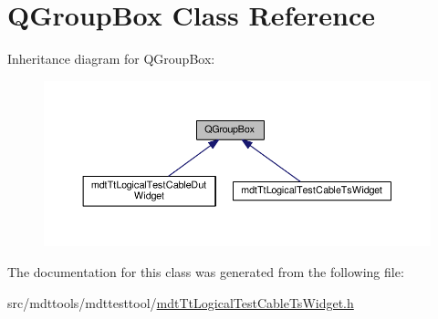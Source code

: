 \hypertarget{class_q_group_box}{\section{Q\-Group\-Box Class Reference}
\label{class_q_group_box}
}


Inheritance diagram for Q\-Group\-Box\-:
\nopagebreak
\begin{figure}[H]
\begin{center}
\leavevmode
\includegraphics[width=350pt]{class_q_group_box__inherit__graph}
\end{center}
\end{figure}


The documentation for this class was generated from the following file\-:\begin{DoxyCompactItemize}
\item 
src/mdttools/mdttesttool/\hyperlink{mdt_tt_logical_test_cable_ts_widget_8h}{mdt\-Tt\-Logical\-Test\-Cable\-Ts\-Widget.\-h}\end{DoxyCompactItemize}
